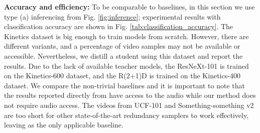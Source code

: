 \documentclass[a4paper,conference]{IEEEtran}
\begin{document}
\cite{devries2018learning}
\cite{gal2016uncertainty}
\cite{gao2020listen}
\cite{korbar2019scsampler}

{\bf Accuracy and efficiency:} To be comparable to baselines, in this section we use type (a) inferencing from Fig. \ref{fig:inference}; experimental results with classification accuracy are shown in Fig. \ref{tab:classification_accuracy}. The Kinetics dataset is big enough to train models from scratch. However, there are different variants, and a percentage of video samples may not be available or accessible. Nevertheless, we distill a student using this dataset and report the results. Due to the lack of available teacher models, the ResNeXt-101 is trained on the Kinetics-600 dataset, and the R(2+1)D is trained on the Kinetics-400 dataset. We compare the non-trivial baselines \cite{korbar2019scsampler, devries2018learning} and it is important to note that the results reported directly from \cite{korbar2019scsampler} have access to the audio while our method does not require audio access. The videos from UCF-101 and Something-something v2 are too short for other state-of-the-art redundancy samplers \cite{korbar2019scsampler, gao2020listen} to work effectively, leaving \cite{devries2018learning} as the only applicable baseline. 
\end{document}

